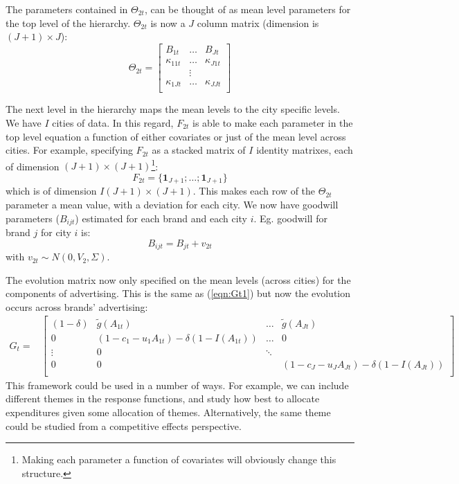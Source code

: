 \documentclass[11pt]{article} %
\begin{document}
The parameters contained in $\Theta_{2t}$, can be thought of as mean level parameters for the 
top level of the hierarchy.  $\Theta_{2t}$ is now a $J$ column matrix (dimension is $(J+1) \times J$):
\begin{equation}
\Theta_{2t} =\left[ \begin{array}{ccc} 
			B_{1t}  & \ldots & B_{Jt} \\
			\kappa_{11t}  &\ldots & \kappa_{J1t}   \\
			&\vdots\\
			\kappa_{1Jt}  &\ldots & \kappa_{JJt}  \\
			\end{array} \right]
\end{equation}

The next level in the hierarchy maps the mean levels to the city specific levels.  We have $I$ cities 
of data.  In this regard, $F_{2t}$ is able
to make each parameter in the top level equation a function of either covariates or just of the mean level
across cities.  For example, specifying $F_{2t}$ as a stacked matrix of $I$ identity matrixes, each of dimension $(J+1) \times (J+1)$\footnote{Making each parameter a function of covariates will obviously change this structure.}:
\[
F_{2t} = \{ \mathbf{1}_{J+1} ;  \ldots ; \mathbf{1}_{J+1}\}
\]
which is of dimension $I(J+1) \times (J+1)$.  
This makes each row of the $\Theta_{2t}$ parameter a mean value, with a deviation for each
city.  We now have goodwill parameters ($B_{ijt}$) estimated for each brand and each city $i$.  
Eg. goodwill for brand $j$ for city $i$ is:
\[
B_{ijt} = B_{jt} + v_{2t}  
\]
with $v_{2t} \sim N(0,  V_2, \Sigma)$.  

The evolution matrix now only specified on the mean levels (across cities) for the components of advertising.
This is the same as (\ref{eqn:Gt1}) but now the evolution occurs across brands' advertising: 
\begin{equation}
\begin{array}{ll}
      G_t = & \left[\begin{array}{cccl}
		 (1-\delta) & \tilde{g}(A_{1t}) & \ldots & \tilde{g}(A_{Jt}) \\
		0 & (1-c_1-u_1 A_{1t}) - \delta(1-I(A_{1t})) & \ldots & 0 \\
\vdots & 0 & \ddots \\
		0 & 0 &  & (1-c_J-u_J A_{Jt}) - \delta(1-I(A_{Jt})) \\
		\end{array}\right]
\end{array}
\end{equation}
This framework could be used in a number of ways. 
For example, we can include different themes in the response functions, and study how best to allocate expenditures
given some allocation of themes.   Alternatively, the same theme could be studied from a competitive
effects perspective.   
\end{document}
